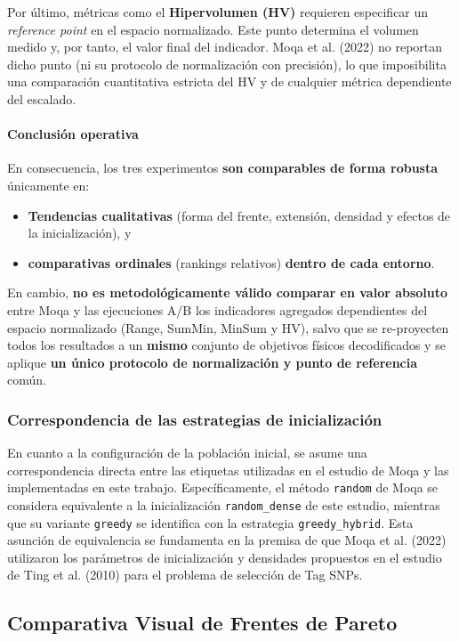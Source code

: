 \documentclass[a4paper,10pt]{article}
\begin{document}
Por último, métricas como el \textbf{Hipervolumen (HV)} requieren especificar un \textit{reference point} en el espacio normalizado. Este punto determina el volumen medido y, por tanto, el valor final del indicador. Moqa et al. (2022) no reportan dicho punto (ni su protocolo de normalización con precisión), lo que imposibilita una comparación cuantitativa estricta del HV y de cualquier métrica dependiente del escalado.

\paragraph{Conclusión operativa}
En consecuencia, los tres experimentos \textbf{son comparables de forma robusta} únicamente en:
\begin{itemize}
    \item \textbf{Tendencias cualitativas} (forma del frente, extensión, densidad y efectos de la inicialización), y
    \item \textbf{comparativas ordinales} (rankings relativos) \textbf{dentro de cada entorno}.
\end{itemize}
En cambio, \textbf{no es metodológicamente válido comparar en valor absoluto} entre Moqa y las ejecuciones A/B los indicadores agregados dependientes del espacio normalizado (Range, SumMin, MinSum y HV), salvo que se re-proyecten todos los resultados a un \textbf{mismo} conjunto de objetivos físicos decodificados y se aplique \textbf{un único protocolo de normalización y punto de referencia} común.

\subsubsection{Correspondencia de las estrategias de inicialización}

En cuanto a la configuración de la población inicial, se asume una correspondencia directa entre las etiquetas utilizadas en el estudio de Moqa y las implementadas en este trabajo. Específicamente, el método \texttt{random} de Moqa se considera equivalente a la inicialización \texttt{random\_dense} de este estudio, mientras que su variante \texttt{greedy} se identifica con la estrategia \texttt{greedy\_hybrid}. Esta asunción de equivalencia se fundamenta en la premisa de que Moqa et al. (2022) utilizaron los parámetros de inicialización y densidades propuestos en el estudio de Ting et al. (2010) para el problema de selección de Tag SNPs.


\subsection{Comparativa Visual de Frentes de Pareto}
\label{sec:comparativa_visual_frentes}
\end{document}
